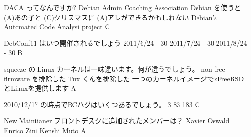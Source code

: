 %

\santaku
{DACA ってなんですか?}
{Debian Admin Coaching Association}
{Debian を使うと (A)あの子と (C)クリスマスに (A)アレができるかもしれない}
{Debian's Automated Code Analysi project}
{C}
{}

\santaku
{DebConf11 はいつ開催されるでしょう}
{2011/6/24 - 30}
{2011/7/24 - 30}
{2011/8/24 - 30}
{B}
{}

\santaku
{squeeze の Linux カーネルは一味違います。何が違うでしょう。}
{non-free firmware を排除した}
{Tux くんを排除した}
{一つのカーネルイメージでkFreeBSDとLinuxを提供します}
{A}
{}

\santaku
{2010/12/17 の時点でRCハグはいくつあるでしょう。}
{3} 
{83}
{183}
{C}
{}

\santaku
{New Maintianer フロントデスクに追加されたメンバーは？}
{Xavier Oswald}
{Enrico Zini}
{Kenshi Muto}
{A}
{}
